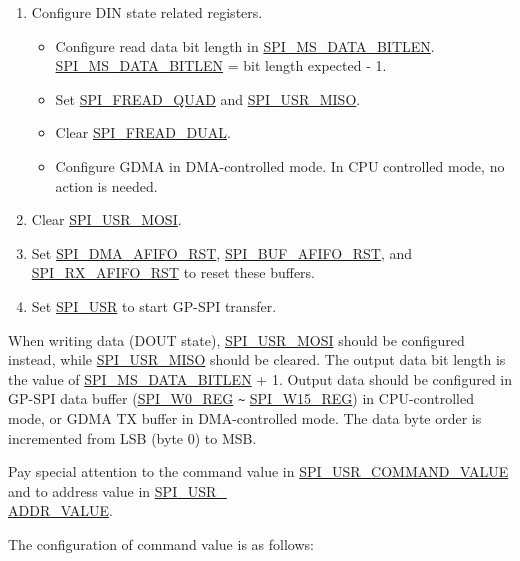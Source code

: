 \documentclass[main\_\_EN.tex]{subfiles}
\begin{document}
\begin{enumerate}
    \item Configure DIN state related registers.
        \begin{itemize}
            \item Configure read data bit length in \hyperref[fielddesc:SPIMSDATABITLEN]{SPI\_MS\_DATA\_BITLEN}. \hyperref[fielddesc:SPIMSDATABITLEN]{SPI\_MS\_DATA\_BITLEN} = bit length expected - 1.
            \item Set \hyperref[fielddesc:SPIFREADQUAD]{SPI\_FREAD\_QUAD} and \hyperref[fielddesc:SPIUSRMISO]{SPI\_USR\_MISO}.
            \item Clear \hyperref[fielddesc:SPIFREADDUAL]{SPI\_FREAD\_DUAL}.
            \item Configure GDMA in DMA-controlled mode. In CPU controlled mode, no action is needed.
        \end{itemize}

    \item Clear \hyperref[fielddesc:SPIUSRMOSI]{SPI\_USR\_MOSI}.
    \item Set \hyperref[fielddesc:SPIDMAAFIFORST]{SPI\_DMA\_AFIFO\_RST}, \hyperref[fielddesc:SPIBUFAFIFORST]{SPI\_BUF\_AFIFO\_RST}, and \hyperref[fielddesc:SPIRXAFIFORST]{SPI\_RX\_AFIFO\_RST} to reset these buffers.

    \item Set \hyperref[fielddesc:SPIUSR]{SPI\_USR} to start GP-SPI transfer.
\end{enumerate}

When writing data (DOUT state), \hyperref[fielddesc:SPIUSRMOSI]{SPI\_USR\_MOSI} should be configured instead, while \hyperref[fielddesc:SPIUSRMISO]{SPI\_USR\_MISO} should be cleared. The output data bit length is the value of \hyperref[fielddesc:SPIMSDATABITLEN]{SPI\_MS\_DATA\_BITLEN} + 1. Output data should be configured in GP-SPI data buffer (\hyperref[regdesc:SPIW0REG]{SPI\_W0\_REG} \verb+~+ \hyperref[regdesc:SPIW15REG]{SPI\_W15\_REG}) in CPU-controlled mode, or GDMA TX buffer in DMA-controlled mode. The data byte order is incremented from LSB (byte 0) to MSB.

Pay special attention to the command value in \hyperref[fielddesc:SPIUSRCOMMANDVALUE]{SPI\_USR\_COMMAND\_VALUE} and to address value in \hyperref[fielddesc:SPIUSRADDRVALUE]{SPI\_USR\_\\ADDR\_VALUE}.

The configuration of command value is as follows:
\end{document}
